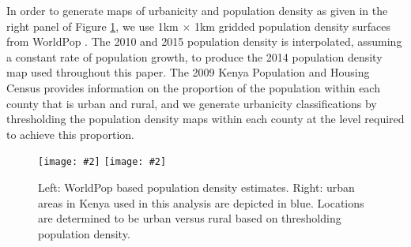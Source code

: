 \documentclass[12pt]{article}
\newcommand{\image}[2]{\texttt{[image: \#2]}}
\begin{document}
In order to generate maps of urbanicity and population density as given in the right panel of Figure \ref{fig:urbanMap}, we use 1km $ \times $ 1km gridded population density surfaces from WorldPop \citep{stevens2015disaggregating,tatem2017worldpop}. The 2010 and 2015 population density is interpolated, assuming a constant rate of population growth, to produce the 2014 population density map used throughout this paper. 
The 2009 Kenya Population and Housing Census provides information on the proportion of the population within each county that is urban and rural, and we generate urbanicity classifications by thresholding the population density maps within each county at the level required to achieve this proportion.

\begin{figure}
\centering
\image{width=3.16in}{../figures/populationDensity.png} \image{width=2.89in}{../figures/urbanMapWhiteRural.png}
\caption{Left: WorldPop based population density estimates. Right: urban areas in Kenya used in this analysis are depicted in blue. Locations are determined to be urban versus rural based on thresholding population density.}
\label{fig:urbanMap}
\end{figure}
\end{document}
